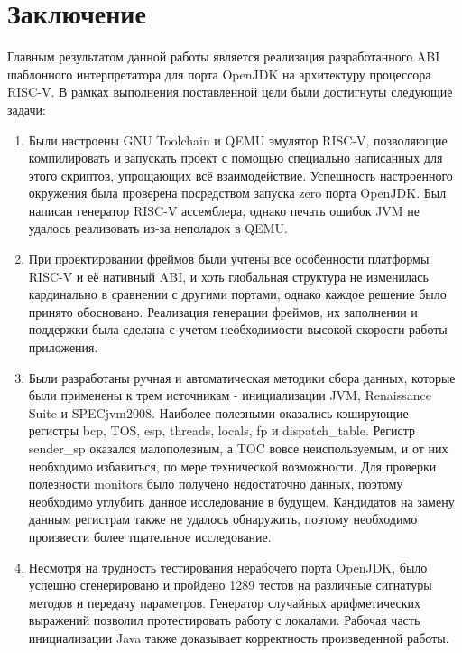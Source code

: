 \section*{Заключение}

Главным результатом данной работы является реализация разработанного ABI шаблонного интерпретатора для порта OpenJDK на архитектуру процессора RISC-V. В рамках выполнения поставленной цели были достигнуты следующие задачи:

\begin{enumerate}
    \item Были настроены GNU Toolchain и QEMU эмулятор RISC-V, позволяющие компилировать и запускать проект с помощью специально написанных для этого скриптов, упрощающих всё взаимодействие. Успешность настроенного окружения была проверена посредством запуска zero порта OpenJDK. Был написан генератор RISC-V ассемблера, однако печать ошибок JVM не удалось реализовать из-за неполадок в QEMU.
    
    \item При проектировании фреймов были учтены все особенности платформы RISC-V и её нативный ABI, и хоть глобальная структура не изменилась кардинально в сравнении с другими портами, однако каждое решение было принято обосновано. Реализация генерации фреймов, их заполнении и поддержки была сделана с учетом необходимости высокой скорости работы приложения.
    
    \item Были разработаны ручная и автоматическая методики сбора данных, которые были применены к трем источникам - инициализации JVM, Renaissance Suite и SPECjvm2008. Наиболее полезными оказались кэширующие регистры bcp, TOS, esp, threads, locals, fp и dispatch\_table. Регистр sender\_sp оказался малополезным, а TOC вовсе неиспользуемым, и от них необходимо избавиться, по мере технической возможности. Для проверки полезности monitors было получено недостаточно данных, поэтому необходимо углубить данное исследование в будущем. Кандидатов на замену данным регистрам также не удалось обнаружить, поэтому необходимо произвести более тщательное исследование.
    
    \item Несмотря на трудность тестирования нерабочего порта OpenJDK, было успешно сгенерировано и пройдено 1289 тестов на различные сигнатуры методов и передачу параметров. Генератор случайных арифметических выражений позволил протестировать работу с локалами. Рабочая часть инициализации Java также доказывает корректность произведенной работы.
\end{enumerate}

